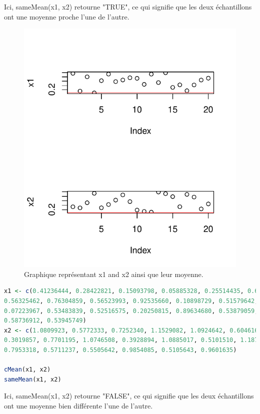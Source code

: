 Ici, sameMean(x1, x2) retourne "TRUE", ce qui signifie que les deux échantillons ont une moyenne proche l'une de l'autre.

\begin{figure}[htbp]
	\begin{center}
		\includegraphics[width=12cm]{x1-x2-1.pdf}
		\caption{Graphique représentant x1 and x2 ainsi que leur moyenne.}
		\label{fig:x1-x2-1}
	\end{center}
\end{figure}

\begin{lstlisting}[language=R]
x1 <- c(0.41236444, 0.28422821, 0.15093798, 0.05885328, 0.25514435, 0.63026931,
0.56325462, 0.76304859, 0.56523993, 0.92535660, 0.10898729, 0.51579642,
0.07223967, 0.53483839, 0.52516575, 0.20250815, 0.89634680, 0.53879059,
0.58736912, 0.53945749)
x2 <- c(1.0809923, 0.5772333, 0.7252340, 1.1529082, 1.0924642, 0.6046166, 0.9495800,
0.3019857, 0.7701195, 1.0746508, 0.3928894, 1.0885017, 0.5101510, 1.1871599,
0.7953318, 0.5711237, 0.5505642, 0.9854085, 0.5105643, 0.9601635)

cMean(x1, x2)
sameMean(x1, x2)
\end{lstlisting}

Ici, sameMean(x1, x2) retourne "FALSE", ce qui signifie que les deux échantillons ont une moyenne bien différente l'une de l'autre.


